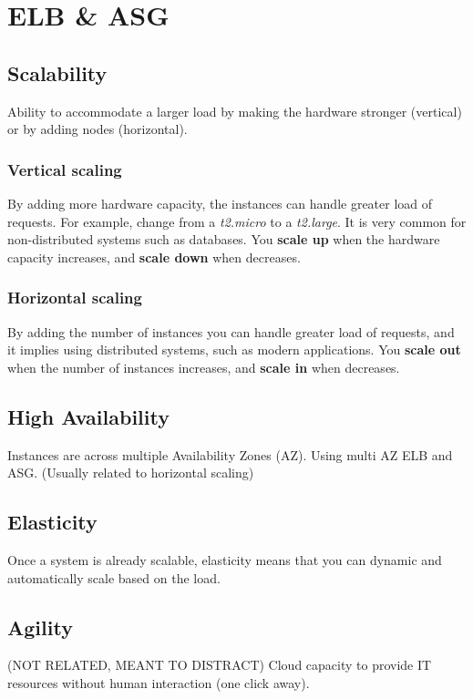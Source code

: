\section{ELB \& ASG}\label{sec:elb-&-asg}

\subsection{Scalability}\label{subsec:scalability}
Ability to accommodate a larger load by making the hardware stronger (vertical) or by adding nodes (horizontal).

\subsubsection{Vertical scaling}
By adding more hardware capacity, the instances can handle greater load of requests.
For example, change from a \textit{t2.micro} to a \textit{t2.large}.
It is very common for non-distributed systems such as databases.
You \textbf{scale up} when the hardware capacity increases, and \textbf{scale down} when decreases.

\subsubsection{Horizontal scaling}
By adding the number of instances you can handle greater load of requests, and it implies using distributed systems, such as modern applications.
You \textbf{scale out} when the number of instances increases, and \textbf{scale in} when decreases.

\subsection{High Availability}\label{subsec:high-availability}
Instances are across multiple Availability Zones (AZ). Using multi AZ ELB and ASG. (Usually related to horizontal scaling)

\subsection{Elasticity}\label{subsec:elasticity}
Once a system is already scalable, elasticity means that you can dynamic and automatically scale based on the load.

\subsection{Agility}
(NOT RELATED, MEANT TO DISTRACT)\label{subsec:agility} Cloud capacity to provide IT resources without human interaction (one click away).

